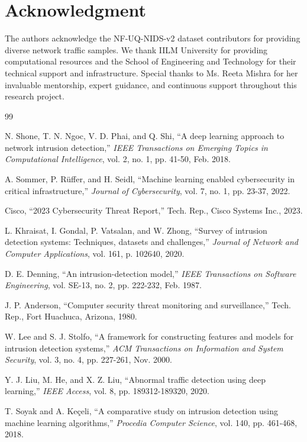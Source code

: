 \documentclass[conference]{IEEEtran}
\begin{document}
\section*{Acknowledgment}

The authors acknowledge the NF-UQ-NIDS-v2 dataset contributors for providing diverse network traffic 
samples. We thank IILM University for providing computational resources and the School of Engineering and 
Technology for their technical support and infrastructure. Special thanks to Ms. Reeta Mishra for her 
invaluable mentorship, expert guidance, and continuous support throughout this research project.

\begin{thebibliography}{99}

N. Shone, T. N. Ngoc, V. D. Phai, and Q. Shi, 
``A deep learning approach to network intrusion detection,'' 
\textit{IEEE Transactions on Emerging Topics in Computational Intelligence}, vol. 2, no. 1, pp. 41-50, Feb. 2018.

A. Sommer, P. Rüffer, and H. Seidl,
``Machine learning enabled cybersecurity in critical infrastructure,''
\textit{Journal of Cybersecurity}, vol. 7, no. 1, pp. 23-37, 2022.

Cisco, 
``2023 Cybersecurity Threat Report,''
Tech. Rep., Cisco Systems Inc., 2023.

L. Khraisat, I. Gondal, P. Vatsalan, and W. Zhong,
``Survey of intrusion detection systems: Techniques, datasets and challenges,''
\textit{Journal of Network and Computer Applications}, vol. 161, p. 102640, 2020.

D. E. Denning,
``An intrusion-detection model,''
\textit{IEEE Transactions on Software Engineering}, vol. SE-13, no. 2, pp. 222-232, Feb. 1987.

J. P. Anderson,
``Computer security threat monitoring and surveillance,''
Tech. Rep., Fort Huachuca, Arizona, 1980.

W. Lee and S. J. Stolfo,
``A framework for constructing features and models for intrusion detection systems,''
\textit{ACM Transactions on Information and System Security}, vol. 3, no. 4, pp. 227-261, Nov. 2000.

Y. J. Liu, M. He, and X. Z. Liu,
``Abnormal traffic detection using deep learning,''
\textit{IEEE Access}, vol. 8, pp. 189312-189320, 2020.

T. Soyak and A. Keçeli,
``A comparative study on intrusion detection using machine learning algorithms,''
\textit{Procedia Computer Science}, vol. 140, pp. 461-468, 2018.


\end{thebibliography}
\end{document}
